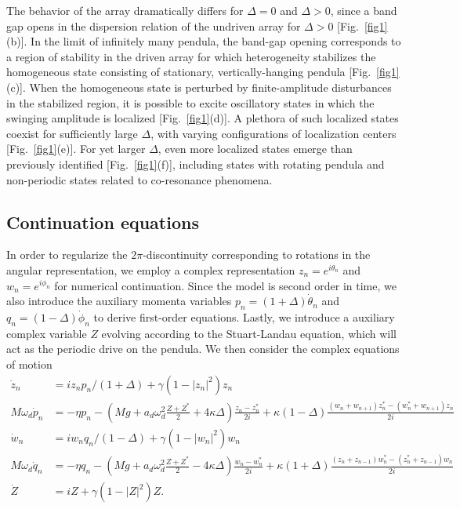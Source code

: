 \documentclass[aps,pre,amsmath,amssymb,floatfix,onecolumn,notitlepage,10pt]{revtex4-1}
\begin{document}
The behavior of the array dramatically differs for $\Delta=0$ and $\Delta>0$, since a band gap opens in the dispersion relation of the undriven array for $\Delta>0$ [Fig.~\ref{fig1}(b)]. In the limit of infinitely many pendula, the band-gap opening corresponds to a region of stability in the driven array for which heterogeneity stabilizes the homogeneous state consisting of stationary, vertically-hanging pendula [Fig.~\ref{fig1}(c)]. When the homogeneous state is perturbed by finite-amplitude disturbances in the stabilized region, it is possible to excite oscillatory states in which the swinging amplitude is localized [Fig.~\ref{fig1}(d)]. A plethora of such localized states coexist for sufficiently large $\Delta$, with varying configurations of localization centers [Fig.~\ref{fig1}(e)]. For yet larger $\Delta$, even more localized states emerge than previously identified [Fig.~\ref{fig1}(f)], including states with rotating pendula and non-periodic states related to co-resonance phenomena.

\subsection{Continuation equations}
In order to regularize the $2\pi$-discontinuity corresponding to rotations in the angular representation, we employ a complex representation $z_n=e^{i\theta_n}$ and $w_n=e^{i\phi_n}$ for numerical continuation. Since the model is second order in time, we also introduce the auxiliary momenta variables $p_n = (1+\Delta)\dot{\theta}_n$ and $q_n=(1-\Delta)\dot{\phi}_n$ to derive first-order equations.  Lastly, we introduce a auxiliary complex variable $Z$ evolving according to the Stuart-Landau equation, which will act as the periodic drive on the pendula. We then consider the complex equations of motion
\begin{align}
\dot{z}_n&=iz_np_n/(1+\Delta)+\gamma(1-|z_n|^2)z_n \label{cpendula1} \\
M\omega_d\dot{p}_n&=-\eta p_n - (Mg+a_d\omega_d^2\frac{Z+Z^*}{2}+4\kappa\Delta)\frac{z_n-z_n^*}{2i} +\kappa(1-\Delta)\frac{(w_n+w_{n+1})z_n^*-(w_n^*+w_{n+1})z_n}{2i} \label{cpendula2} \\
\dot{w}_n&=iw_nq_n/(1-\Delta)+\gamma(1-|w_n|^2)w_n \label{cpendula3} \\
M\omega_d\dot{q}_n&=-\eta q_n-(Mg+a_d\omega_d^2\frac{Z+Z^*}{2}-4\kappa\Delta)\frac{w_n-w_n^*}{2i} +\kappa(1+\Delta)\frac{(z_n+z_{n-1})w_n^*-(z_n^*+z_{n-1})w_n}{2i} \label{cpendula4}\\
\dot{Z}&=iZ+\gamma(1-|Z|^2)Z. \label{cpendula5}
\end{align}
\end{document}
